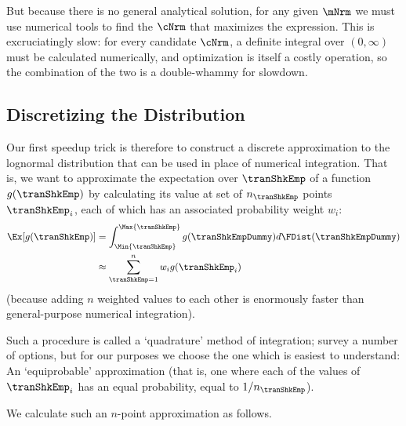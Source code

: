 But because there is no general analytical solution, for any given $\mNrm$ we must use numerical tools to find the $\cNrm$ that maximizes the expression.  This is excruciatingly slow: for every candidate $\cNrm$, a definite integral over $(0,\infty)$ must be calculated numerically, and optimization is itself a costly operation, so the combination of the two is a double-whammy for slowdown.

\hypertarget{discretizing-the-distribution}{}
\subsection{Discretizing the Distribution}
Our first speedup trick is therefore to construct a discrete approximation to the lognormal distribution that can be used in place of numerical integration.  That is, we want to approximate the expectation over $\tranShkEmp$ of a function $g(\tranShkEmp)$ by calculating its value at set of $n_{\tranShkEmp}$ points $\tranShkEmp_{i}$, each of which has an associated probability weight $w_{i}$:
\begin{equation*}\begin{gathered}\begin{aligned}
      \Ex[g(\tranShkEmp)] & = \int_{\Min{\tranShkEmp}}^{\Max{\tranShkEmp}}g(\tranShkEmpDummy)d\FDist(\tranShkEmpDummy) \\
      & \approx \sum_{\tranShkEmp = 1}^{n}w_{i}g(\tranShkEmp_{i})
    \end{aligned}\end{gathered}\end{equation*}
(because adding $n$ weighted values to each other is enormously faster than general-purpose numerical integration).

Such a procedure is called a `quadrature' method of integration; \cite{Tanaka2013-bc} survey a number of options, but for our purposes we choose the one which is easiest to understand: An `equiprobable' approximation (that is, one where each of the values of $\tranShkEmp_{i}$ has an equal probability, equal to $1/n_{\tranShkEmp}$).

We calculate such an $n$-point approximation as follows.

